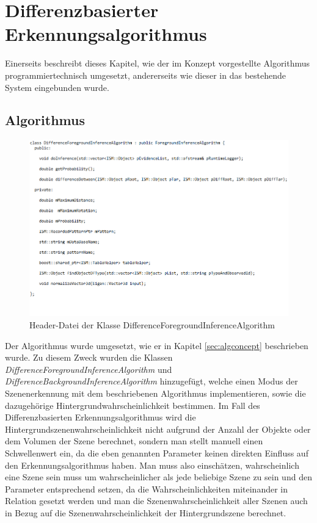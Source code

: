 \section{Differenzbasierter Erkennungsalgorithmus}
Einerseits beschreibt dieses Kapitel, wie der im Konzept vorgestellte Algorithmus programmiertechnisch umgesetzt, andererseits wie dieser in das bestehende System eingebunden wurde. 
\subsection{Algorithmus}\label{sub:alg}
\begin{figure}
	\centering
	\includegraphics[width=17cm]{bilder/DifferenceClass.pdf}
	\caption{Header-Datei der Klasse DifferenceForegroundInferenceAlgorithm}
	\label{img:diffclass}
\end{figure}
Der Algorithmus wurde umgesetzt, wie er in Kapitel \ref{sec:algconcept} beschrieben wurde. Zu diesem Zweck wurden die Klassen \textit{DifferenceForegroundInferenceAlgorithm} und \textit{DifferenceBackgroundInferenceAlgorithm} hinzugefügt, welche einen Modus der Szenenerkennung mit dem beschriebenen Algorithmus implementieren, sowie die dazugehörige Hintergrundwahrscheinlichkeit bestimmen. Im Fall des Differenzbasierten Erkennungsalgorithmus wird die Hintergrundszenenwahrscheinlichkeit nicht aufgrund der Anzahl der Objekte oder dem Volumen der Szene berechnet, sondern man stellt manuell einen Schwellenwert ein, da die eben genannten Parameter keinen direkten Einfluss auf den Erkennungsalgorithmus haben. Man muss also einschätzen, wahrscheinlich eine Szene sein muss um wahrscheinlicher als jede beliebige Szene zu sein und den Parameter entsprechend setzen, da die Wahrscheinlichkeiten miteinander in Relation gesetzt werden und man die Szenenwahrscheinlichkeit aller Szenen auch in Bezug auf die Szenenwahrscheinlichkeit der Hintergrundszene berechnet.\smallskip\\
